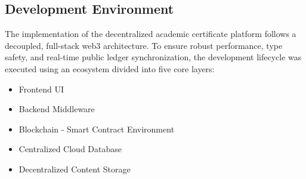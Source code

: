 \subsection{Development Environment}

        The implementation of the decentralized academic certificate platform follows a decoupled, full-stack web3 architecture. To ensure robust performance, type safety, and real-time public ledger synchronization, the development lifecycle was executed using an ecosystem divided into five core layers: 

        \begin{itemize}
            \item Frontend UI

            \item Backend Middleware

            \item Blockchain - Smart Contract Environment

            \item Centralized Cloud Database

            \item Decentralized Content Storage
        \end{itemize}

        

        